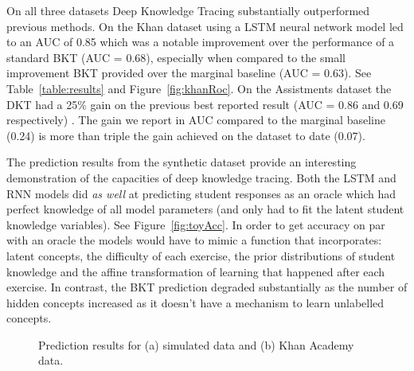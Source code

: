 On all three datasets Deep Knowledge Tracing substantially outperformed previous methods. On the Khan dataset using a LSTM neural network model led to an AUC of 0.85 which was a notable improvement over the performance of a standard BKT (AUC = 0.68), especially when compared to the small improvement BKT provided over the marginal baseline (AUC = 0.63). See Table~\ref{table:results} and Figure~\ref{fig:khanRoc}. On the Assistments dataset the DKT had a 25\% gain on the previous best reported result (AUC = 0.86 and 0.69 respectively) \cite{pardos2011kt}. The gain we report in AUC compared to the marginal baseline (0.24) is more than triple the gain achieved on the dataset to date (0.07).

The prediction results from the synthetic dataset provide an interesting demonstration of the capacities of deep knowledge tracing. Both the LSTM and RNN models did \emph{as well} at predicting student responses as an oracle which had perfect knowledge of all model parameters (and only had to fit the latent student knowledge variables). See Figure~\ref{fig:toyAcc}. In order to get accuracy on par with an oracle the models would have to mimic a function that incorporates: latent concepts, the difficulty of each exercise, the prior distributions of student knowledge and the affine transformation of learning that happened after each exercise. In contrast, the BKT prediction degraded substantially as the number of hidden concepts increased as it doesn't have a mechanism to learn unlabelled concepts.


 \begin{figure}[ht]
 \centering
 
 \caption[Deep Knowledge Tracing accuracies]{Prediction results for (a) simulated data and (b) Khan Academy data.}

 \end{figure}


